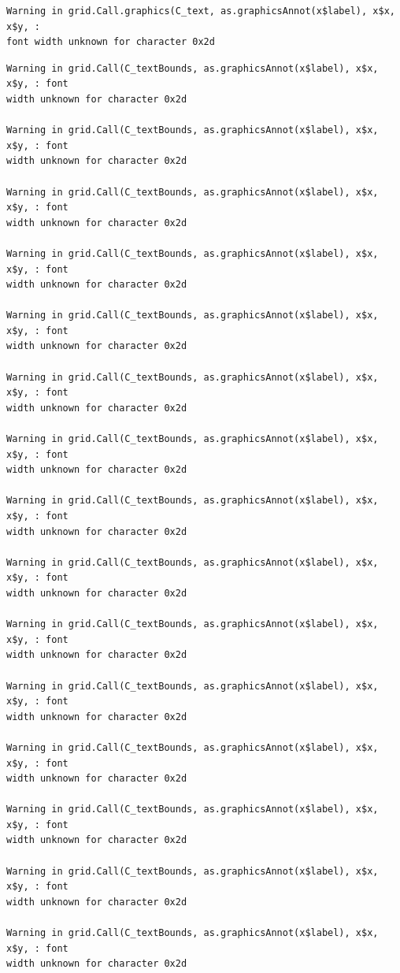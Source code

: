 \documentclass[
  letterpaper,
  DIV=11,
  numbers=noendperiod]{scrreprt}
\begin{document}
\begin{verbatim}
Warning in grid.Call.graphics(C_text, as.graphicsAnnot(x$label), x$x, x$y, :
font width unknown for character 0x2d
\end{verbatim}

\begin{verbatim}
Warning in grid.Call(C_textBounds, as.graphicsAnnot(x$label), x$x, x$y, : font
width unknown for character 0x2d

Warning in grid.Call(C_textBounds, as.graphicsAnnot(x$label), x$x, x$y, : font
width unknown for character 0x2d

Warning in grid.Call(C_textBounds, as.graphicsAnnot(x$label), x$x, x$y, : font
width unknown for character 0x2d

Warning in grid.Call(C_textBounds, as.graphicsAnnot(x$label), x$x, x$y, : font
width unknown for character 0x2d

Warning in grid.Call(C_textBounds, as.graphicsAnnot(x$label), x$x, x$y, : font
width unknown for character 0x2d

Warning in grid.Call(C_textBounds, as.graphicsAnnot(x$label), x$x, x$y, : font
width unknown for character 0x2d

Warning in grid.Call(C_textBounds, as.graphicsAnnot(x$label), x$x, x$y, : font
width unknown for character 0x2d

Warning in grid.Call(C_textBounds, as.graphicsAnnot(x$label), x$x, x$y, : font
width unknown for character 0x2d

Warning in grid.Call(C_textBounds, as.graphicsAnnot(x$label), x$x, x$y, : font
width unknown for character 0x2d

Warning in grid.Call(C_textBounds, as.graphicsAnnot(x$label), x$x, x$y, : font
width unknown for character 0x2d

Warning in grid.Call(C_textBounds, as.graphicsAnnot(x$label), x$x, x$y, : font
width unknown for character 0x2d

Warning in grid.Call(C_textBounds, as.graphicsAnnot(x$label), x$x, x$y, : font
width unknown for character 0x2d

Warning in grid.Call(C_textBounds, as.graphicsAnnot(x$label), x$x, x$y, : font
width unknown for character 0x2d

Warning in grid.Call(C_textBounds, as.graphicsAnnot(x$label), x$x, x$y, : font
width unknown for character 0x2d

Warning in grid.Call(C_textBounds, as.graphicsAnnot(x$label), x$x, x$y, : font
width unknown for character 0x2d


\end{verbatim}
\end{document}

